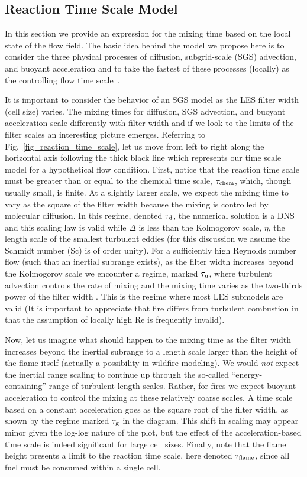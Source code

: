 \subsection{Reaction Time Scale Model}
\label{sec:reac_time_scale}

In this section we provide an expression for the mixing time based on the local state of the flow field.  The basic idea behind the model we propose here is to consider the three physical processes of diffusion, subgrid-scale (SGS) advection, and buoyant acceleration and to take the fastest of these processes (locally) as the controlling flow time scale~\cite{McDermott:2011}.

It is important to consider the behavior of an SGS model as the LES filter width (cell size) varies. The mixing times for diffusion, SGS advection, and buoyant acceleration scale differently with filter width and if we look to the limits of the filter scales an interesting picture emerges.  Referring to Fig.~\ref{fig_reaction_time_scale}, let us move from left to right along the horizontal axis following the thick black line which represents our time scale model for a hypothetical flow condition.  First, notice that the reaction time scale must be greater than or equal to the chemical time scale, $\tau_{\rm chem}$, which, though usually small, is finite. At a slightly larger scale, we expect the mixing time to vary as the square of the filter width because the mixing is controlled by molecular diffusion.  In this regime, denoted $\tau_{\rm d}$, the numerical solution is a DNS and this scaling law is valid while $\Delta$ is less than the Kolmogorov scale, $\eta$, the length scale of the smallest turbulent eddies (for this discussion we assume the Schmidt number (Sc) is of order unity). For a sufficiently high Reynolds number flow (such that an inertial subrange exists), as the filter width increases beyond the Kolmogorov scale we encounter a regime, marked $\tau_{\rm u}$, where turbulent advection controls the rate of mixing and the mixing time varies as the two-thirds power of the filter width \cite{Pope:2000}.  This is the regime where most LES submodels are valid (It is important to appreciate that fire differs from turbulent combustion in that the assumption of locally high Re is frequently invalid).

Now, let us imagine what should happen to the mixing time as the filter width increases beyond the inertial subrange to a length scale larger than the height of the flame itself (actually a possibility in wildfire modeling). We would \emph{not} expect the inertial range scaling to continue up through the so-called ``energy-containing'' range of turbulent length scales.  Rather, for fires we expect buoyant acceleration to control the mixing at these relatively coarse scales.  A time scale based on a constant acceleration goes as the square root of the filter width, as shown by the regime marked $\tau_{\rm g}$ in the diagram.  This shift in scaling may appear minor given the log-log nature of the plot, but the effect of the acceleration-based time scale is indeed significant for large cell sizes.  Finally, note that the flame height presents a limit to the reaction time scale, here denoted $\tau_{\rm flame}$, since all fuel must be consumed within a single cell.

